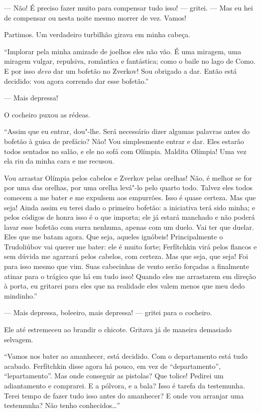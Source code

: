 --- Não! É preciso fazer muito para compensar tudo isso! --- gritei. --- Mas
eu hei de compensar ou nesta noite mesmo morrer de vez. Vamos!

Partimos. Um verdadeiro turbilhão girava em minha cabeça.

“Implorar pela minha amizade de joelhos eles não vão. É uma miragem, uma
miragem vulgar, repulsiva, romântica e fantástica; como o baile no lago
de Como. E por isso \textit{devo} dar um bofetão no Zverkov! Sou
obrigado a dar. Então está decidido: vou agora correndo dar esse
bofetão.”

--- Mais depressa!

O cocheiro puxou as rédeas.

“Assim que eu entrar, dou"-lhe. Será necessário dizer algumas palavras
antes do bofetão à guisa de prefácio? Não! Vou simplesmente entrar e dar.
Eles estarão todos sentados no salão, e ele no sofá com Olímpia.
Maldita Olímpia! Uma vez ela riu da minha cara e me recusou.

Vou arrastar Olímpia pelos cabelos e Zverkov pelas orelhas! Não, é
melhor se for por uma das orelhas, por uma orelha levá"-lo pelo quarto
todo. Talvez eles todos comecem a me bater e me expulsem aos empurrões.
Isso é quase certeza. Mas que seja! Ainda assim eu terei dado o
primeiro bofetão: a iniciativa terá sido minha; e pelos códigos de
honra isso é o que importa; ele já estará manchado e não poderá lavar
esse bofetão com surra nenhuma, apenas com um duelo. Vai ter que
duelar. Eles que me batam agora. Que seja, aqueles ignóbeis!
Principalmente o Trudoliúbov vai querer me bater: ele é muito forte;
Ferfítchkin virá pelos flancos e sem dúvida me agarrará pelos cabelos,
com certeza. Mas que seja, que seja! Foi para isso mesmo que vim. Suas
cabecinhas de vento serão forçadas a finalmente atinar para o trágico
que há em tudo isso! Quando eles me arrastarem em direção à porta, eu
gritarei para eles que na realidade eles valem menos que meu dedo
mindinho.”

--- Mais depressa, boleeiro, mais depressa! --- gritei para o cocheiro.

Ele até estremeceu ao brandir o chicote. Gritava já de maneira demasiado
selvagem.

“Vamos nos bater ao amanhecer, está decidido. Com o departamento está
tudo acabado. Ferfítchkin disse agora há pouco, em vez de
“departamento”, “lepartamento”. Mas onde conseguir as pistolas? Que
tolice! Pedirei um adiantamento e comprarei. E a pólvora, e a bala?
Isso é tarefa da testemunha. Terei tempo de fazer tudo isso antes do
amanhecer? E onde vou arranjar uma testemunha? Não tenho conhecidos\ldots{}”

